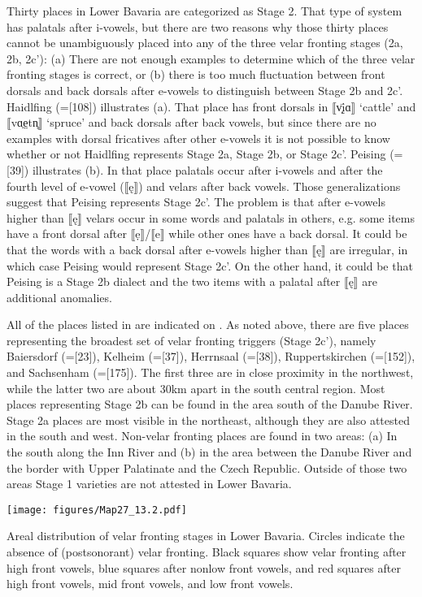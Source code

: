 Thirty places in Lower Bavaria are categorized as Stage 2. That type of system has palatals after i-vowels, but there are two reasons why those thirty places cannot be unambiguously placed into any of the three velar fronting stages (2a, 2b, 2c{}'): (a) There are not enough examples to determine which of the three velar fronting stages is correct, or (b) there is too much fluctuation between front dorsals and back dorsals after e-vowels to distinguish between Stage 2b and 2c{}'. Haidlfing (=[108]) illustrates (a). That place has front dorsals in ⟦v̩\={\k{i}}ɑ⟧ ‘cattle’ and ⟦vɑ̣e̤tn̥⟧ ‘spruce’ and back dorsals after back vowels, but since there are no examples with dorsal fricatives after other e-vowels it is not possible to know whether or not Haidlfing represents Stage 2a, Stage 2b, or Stage 2c{}'. Peising (=[39]) illustrates (b). In that place palatals occur after i-vowels and after the fourth level of e-vowel (⟦ę⟧) and velars after back vowels. Those generalizations suggest that Peising represents Stage 2c'. The problem is that after e-vowels higher than ⟦ę⟧ velars occur in some words and palatals in others, e.g. some items have a front dorsal after ⟦ẹ⟧/⟦e⟧ while other ones have a back dorsal. It could be that the words with a back dorsal after e-vowels higher than ⟦ę⟧ are irregular, in which case Peising would represent Stage 2c'. On the other hand, it could be that Peising is a Stage 2b dialect and the two items with a palatal after ⟦ę⟧ are additional anomalies.

All of the places listed in  are indicated on . As noted above, there are five places representing the broadest set of velar fronting triggers (Stage 2c{}'), namely Baiersdorf (=[23]), Kelheim (=[37]), Herrnsaal (=[38]), Ruppertskirchen (=[152]), and Sachsenham (=[175]). The first three are in close proximity in the northwest, while the latter two are about 30km apart in the south central region. Most places representing Stage 2b can be found in the area south of the Danube River. Stage 2a places are most visible in the northeast, although they are also attested in the south and west. Non-velar fronting places are found in two areas: (a) In the south along the Inn River and (b) in the area between the Danube River and the border with Upper Palatinate and the Czech Republic. Outside of those two areas Stage 1 varieties are not attested in Lower Bavaria.

\begin{map}
\texttt{[image: figures/Map27\_13.2.pdf]}
\caption[Areal distribution of velar fronting stages in Lower Bavaria]{Areal distribution of velar fronting stages in Lower Bavaria. Circles indicate the absence of (postsonorant) velar fronting. Black squares show velar fronting after high front vowels, blue squares after nonlow front vowels, and red squares after high front vowels, mid front vowels, and low front vowels.}\label{map:27}
\end{map}

